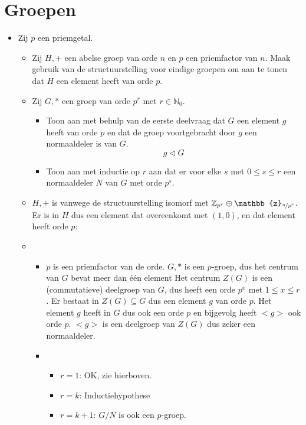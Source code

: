\documentclass[main.tex]{subfiles}
\begin{document}
 \section{Groepen}
 \label{sec:groepen}

 \begin{itemize}
 \item 
   Zij $p$ een priemgetal.
   \begin{itemize}
   \item Zij $H,+$ een abelse groep van orde $n$ en $p$ een priemfactor van $n$.
     Maak gebruik van de structuurstelling voor eindige groepen om aan te tonen dat $H$ een element heeft van orde $p$.
   \item Zij $G,*$ een groep van orde $p^{r}$ met $r\in \mathbb{N}_{0}$.
     \begin{itemize}
     \item Toon aan met behulp van de eerste deelvraag dat $G$ een element $g$ heeft van orde $p$ en dat de groep voortgebracht door $g$ een normaaldeler is van $G$.
       \[ g \triangleleft G \]
     \item 
       Toon aan met inductie op $r$ aan dat er voor elke $s$ met $0\le s \le r$ een normaaldeler $N$ van $G$ met orde $p^{s}$.
     \end{itemize}
   \end{itemize}
   \begin{itemize}
   \item $H,+$ is vanwege de structuurstelling isomorf met
     $\mathbb{Z}_{p^{r}} \oplus \mathbb{z}_{\nicefrac{n}{p^{r}}}$.  Er
     is in $H$ dus een element dat overeenkomt met $(1,0)$, en dat
     element heeft orde $p$:
   \item
     \begin{itemize}
     \item $p$ is een priemfactor van de orde.
       $G,*$ is een $p$-groep, dus het centrum van $G$ bevat meer dan \'e\'en element
       Het centrum $Z(G)$ is een (commutatieve) deelgroep van $G$, dus heeft een orde $p^{x}$ met $1\le x\le r$.
       Er bestaat in $Z(G) \subseteq G$ dus een element $g$ van orde $p$.
       Het element $g$ heeft in $G$ dus ook een orde $p$ en bijgevolg heeft $<g>$ ook orde $p$.
       $<g>$ is een deelgroep van $Z(G)$ dus zeker een normaaldeler.
     \item 
       \begin{itemize}
       \item $r = 1$: OK, zie hierboven.
       \item $r = k$: Inductiehypothese
       \item $r = k+1$:
         $G/N$ is ook een $p$-groep.
       \end{itemize}
     \end{itemize}
   \end{itemize}
   

\end{itemize}
\end{document}
